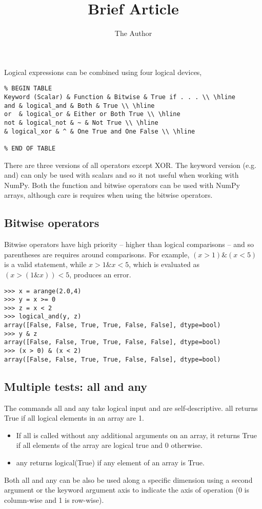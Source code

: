 \documentclass[11pt]{article} %
\title{Brief Article}
\author{The Author}
\begin{document}

Logical expressions can be combined using four logical devices,

\begin{verbatim}
% BEGIN TABLE
Keyword (Scalar) & Function & Bitwise & True if . . . \\ \hline
and & logical_and & Both & True \\ \hline
or  & logical_or & Either or Both True \\ \hline
not & logical_not & ~ & Not True \\ \hline
& logical_xor & ^ & One True and One False \\ \hline

% END OF TABLE
\end{verbatim}
There are three versions of all operators except XOR. The keyword version (e.g. and) can only be used
with scalars and so it not useful when working with NumPy. Both the function and bitwise operators
can be used with NumPy arrays, although care is requires when using the bitwise operators.
 \subsection*{Bitwise operators}
Bitwise operators have high priority – higher than logical comparisons – and so parentheses are requires around
comparisons. 
For example, $(x>1) \& (x<5)$ is a valid statement, while $x>1 \& x<5$, which is evaluated as
$(x>(1 \& x))<5$, produces an error.
\begin{verbatim}
>>> x = arange(2.0,4)
>>> y = x >= 0
>>> z = x < 2
>>> logical_and(y, z)
array([False, False, True, True, False, False], dtype=bool)
>>> y & z
array([False, False, True, True, False, False], dtype=bool)
>>> (x > 0) & (x < 2)
array([False, False, True, True, False, False], dtype=bool)
\end{verbatim}

\subsection{Multiple tests: all and any}
The commands all and any take logical input and are self-descriptive. all returns True if all logical elements
in an array are 1.
\begin{itemize}
\item  If all is called without any additional arguments on an array, it returns True if all
elements of the array are logical true and 0 otherwise. 
\item 
any returns logical(True) if any element of an array is True.
\end{itemize}
Both all and any can be also be used along a specific dimension using a second argument or the
keyword argument axis to indicate the axis of operation (0 is column-wise and 1 is row-wise). 
\end{document}
